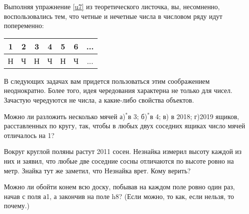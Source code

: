 Выполняя упражнение \ref{u7} из теоретического листочка, вы, несомненно, воспользовались тем, что четные и нечетные числа в числовом ряду идут попеременно:

\begin{table}[h]\centering
	\begin{tabular}{|c|c|c|c|c|c|c|}
		\hline
		1&2&3&4&5&6&...\\
		\hline
		Н&Ч&Н&Ч&Н&Ч&...\\
		\hline
	\end{tabular}
\end{table}

В следующих задачах вам придется пользоваться этим соображением неоднократно. Более того, идея чередования характерна не только для чисел. Зачастую чередуются не числа, а какие-либо свойства объектов.

\begin{thm}	\label{an3.2}
	Можно ли разложить несколько мячей а)$^\ast$в 3; б)$^\ast$в 4; в) в 2018; г)2019 ящиков, расставленных по кругу, так, чтобы в любых двух соседних ящиках число мячей отличалось на 1?
\end{thm}

\begin{thm}\label{1.9}
	Вокруг круглой поляны растут 2011 сосен. Незнайка измерил высоту каждой из них и заявил, что любые две соседние сосны отличаются по высоте ровно на метр. Знайка тут же заметил, что Незнайка врет. Кому верить?
\end{thm}

\begin{thm}\label{an5.1}
	Можно ли обойти конем всю доску, побывав на каждом поле ровно один раз, начав с поля а1, а закончив на поле h8? (Если можно, то как, если нельзя, то почему.)
\end{thm}

\newpage